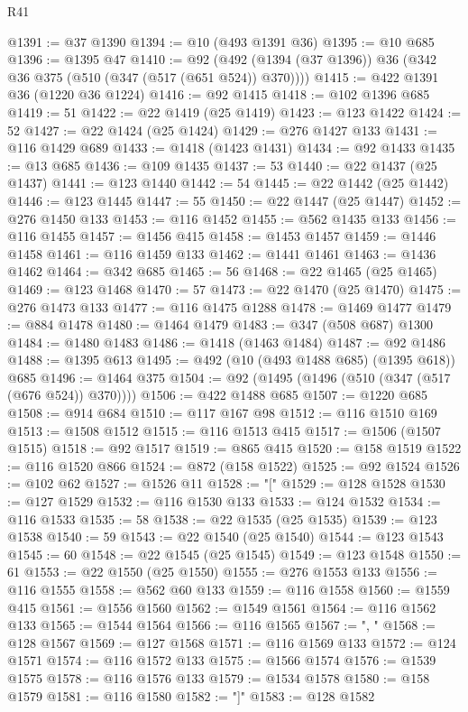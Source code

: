 \begin{lexlean}{R41}
\begin{coremodule}
@1391 := @37 @1390
@1394 := @10 (@493 @1391 @36)
@1395 := @10 @685
@1396 := @1395 @47
@1410 := @92 (@492 (@1394 (@37 @1396)) @36 (@342 @36 @375 (@510 (@347 (@517 (@651 @524)) @370))))
@1415 := @422 @1391 @36 (@1220 @36 @1224)
@1416 := @92 @1415
@1418 := @102 @1396 @685
@1419 := 51
@1422 := @22 @1419 (@25 @1419)
@1423 := @123 @1422
@1424 := 52
@1427 := @22 @1424 (@25 @1424)
@1429 := @276 @1427 @133
@1431 := @116 @1429 @689
@1433 := @1418 (@1423 @1431)
@1434 := @92 @1433
@1435 := @13 @685
@1436 := @109 @1435
@1437 := 53
@1440 := @22 @1437 (@25 @1437)
@1441 := @123 @1440
@1442 := 54
@1445 := @22 @1442 (@25 @1442)
@1446 := @123 @1445
@1447 := 55
@1450 := @22 @1447 (@25 @1447)
@1452 := @276 @1450 @133
@1453 := @116 @1452
@1455 := @562 @1435 @133
@1456 := @116 @1455
@1457 := @1456 @415
@1458 := @1453 @1457
@1459 := @1446 @1458
@1461 := @116 @1459 @133
@1462 := @1441 @1461
@1463 := @1436 @1462
@1464 := @342 @685
@1465 := 56
@1468 := @22 @1465 (@25 @1465)
@1469 := @123 @1468
@1470 := 57
@1473 := @22 @1470 (@25 @1470)
@1475 := @276 @1473 @133
@1477 := @116 @1475 @1288
@1478 := @1469 @1477
@1479 := @884 @1478
@1480 := @1464 @1479
@1483 := @347 (@508 @687) @1300
@1484 := @1480 @1483
@1486 := @1418 (@1463 @1484)
@1487 := @92 @1486
@1488 := @1395 @613
@1495 := @492 (@10 (@493 @1488 @685) (@1395 @618)) @685
@1496 := @1464 @375
@1504 := @92 (@1495 (@1496 (@510 (@347 (@517 (@676 @524)) @370))))
@1506 := @422 @1488 @685
@1507 := @1220 @685
@1508 := @914 @684
@1510 := @117 @167 @98
@1512 := @116 @1510 @169
@1513 := @1508 @1512
@1515 := @116 @1513 @415
@1517 := @1506 (@1507 @1515)
@1518 := @92 @1517
@1519 := @865 @415
@1520 := @158 @1519
@1522 := @116 @1520 @866
@1524 := @872 (@158 @1522)
@1525 := @92 @1524
@1526 := @102 @62
@1527 := @1526 @11
@1528 := "["
@1529 := @128 @1528
@1530 := @127 @1529
@1532 := @116 @1530 @133
@1533 := @124 @1532
@1534 := @116 @1533
@1535 := 58
@1538 := @22 @1535 (@25 @1535)
@1539 := @123 @1538
@1540 := 59
@1543 := @22 @1540 (@25 @1540)
@1544 := @123 @1543
@1545 := 60
@1548 := @22 @1545 (@25 @1545)
@1549 := @123 @1548
@1550 := 61
@1553 := @22 @1550 (@25 @1550)
@1555 := @276 @1553 @133
@1556 := @116 @1555
@1558 := @562 @60 @133
@1559 := @116 @1558
@1560 := @1559 @415
@1561 := @1556 @1560
@1562 := @1549 @1561
@1564 := @116 @1562 @133
@1565 := @1544 @1564
@1566 := @116 @1565
@1567 := ", "
@1568 := @128 @1567
@1569 := @127 @1568
@1571 := @116 @1569 @133
@1572 := @124 @1571
@1574 := @116 @1572 @133
@1575 := @1566 @1574
@1576 := @1539 @1575
@1578 := @116 @1576 @133
@1579 := @1534 @1578
@1580 := @158 @1579
@1581 := @116 @1580
@1582 := "]"
@1583 := @128 @1582

\end{coremodule}
\end{lexlean}

